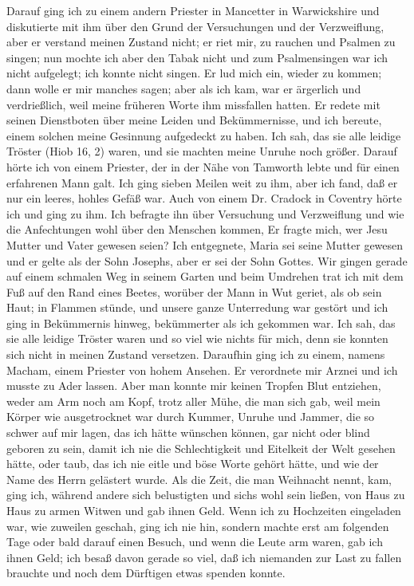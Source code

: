 Darauf ging ich zu einem andern Priester in Mancetter in
Warwickshire und diskutierte mit ihm über den Grund der Versuchungen 
und der Verzweiflung, aber er verstand meinen Zustand
nicht; er riet mir, zu rauchen und Psalmen zu singen; nun mochte
ich aber den Tabak nicht und zum Psalmensingen war ich nicht
aufgelegt; ich konnte nicht singen. Er lud mich ein, wieder zu
kommen; dann wolle er mir manches sagen; aber als ich kam,
war er ärgerlich und verdrießlich, weil meine früheren Worte ihm
missfallen hatten. Er redete mit seinen Dienstboten über meine
Leiden und Bekümmernisse, und ich bereute, einem solchen meine
Gesinnung aufgedeckt zu haben. Ich sah, das sie alle leidige
Tröster (Hiob 16, 2) waren, und sie machten meine Unruhe noch
größer. Darauf hörte ich von einem Priester, der in der Nähe
von Tamworth lebte und für einen erfahrenen Mann galt. Ich
ging sieben Meilen weit zu ihm, aber ich fand, daß er nur ein
leeres, hohles Gefäß war. Auch von einem Dr. Cradock in Coventry
hörte ich und ging zu ihm. Ich befragte ihn über Versuchung
und Verzweiflung und wie die Anfechtungen wohl über den
Menschen kommen, Er fragte mich, wer Jesu Mutter und Vater
gewesen seien? Ich entgegnete, Maria sei seine Mutter gewesen
und er gelte als der Sohn Josephs, aber er sei der Sohn Gottes.
Wir gingen gerade auf einem schmalen Weg in seinem Garten
und beim Umdrehen trat ich mit dem Fuß auf den Rand eines
Beetes, worüber der Mann in Wut geriet, als ob sein Haut; in
Flammen stünde, und unsere ganze Unterredung war gestört und
ich ging in Bekümmernis hinweg, bekümmerter als ich gekommen
war. Ich sah, das sie alle leidige Tröster waren und so viel
wie nichts für mich, denn sie konnten sich nicht in meinen Zustand
versetzen. Daraufhin ging ich zu einem, namens Macham, einem
Priester von hohem Ansehen. Er verordnete mir Arznei und ich
musste zu Ader lassen. Aber man konnte mir keinen Tropfen Blut
entziehen, weder am Arm noch am Kopf, trotz aller Mühe, die
man sich gab, weil mein Körper wie ausgetrocknet war
durch Kummer, Unruhe und Jammer, die so schwer auf mir
lagen, das ich hätte wünschen können, gar nicht oder blind geboren 
zu sein, damit ich nie die Schlechtigkeit und Eitelkeit der
Welt gesehen hätte, oder taub, das ich nie eitle und böse Worte
gehört hätte, und wie der Name des Herrn gelästert wurde. Als
die Zeit, die man Weihnacht nennt, kam, ging ich, während andere
sich belustigten und sichs wohl sein ließen, von Haus zu Haus zu
armen Witwen und gab ihnen Geld. Wenn ich zu Hochzeiten eingeladen 
war, wie zuweilen geschah, ging ich nie hin, sondern machte
erst am folgenden Tage oder bald darauf einen Besuch, und wenn
die Leute arm waren, gab ich ihnen Geld; ich besaß davon gerade 
so viel, daß ich niemanden zur Last zu fallen brauchte und
noch dem Dürftigen etwas spenden konnte.

